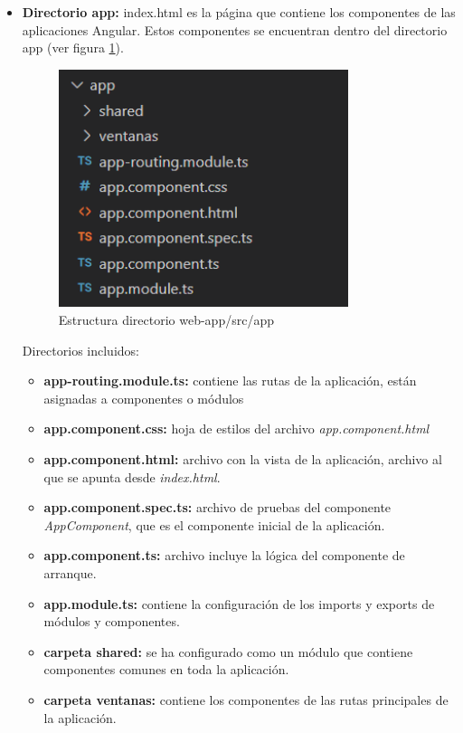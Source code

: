 \begin{itemize}
    \item \textbf{Directorio app:} index.html es la página que contiene los componentes de las aplicaciones Angular. Estos componentes se encuentran dentro del directorio app (ver figura \ref{fig:app_angular}).
    
    \begin{figure}[h!] 
    \centering
        \includegraphics[width=0.8\textwidth]{img/app_angular.PNG}
    \caption{Estructura directorio web-app/src/app}
    \label{fig:app_angular}
    \end{figure}
    
    \newpage
    Directorios incluidos:
    
        \begin{itemize}
            \item \textbf{app-routing.module.ts:} contiene las rutas de la aplicación, están asignadas a componentes o módulos
            \item \textbf{app.component.css:} hoja de estilos del archivo \textit{app.component.html}
            \item \textbf{app.component.html:} archivo con la vista de la aplicación, archivo al que se apunta desde \textit{index.html}.
            \item \textbf{app.component.spec.ts:} archivo de pruebas del componente \textit{AppComponent}, que es el componente inicial de la aplicación.
            \item \textbf{app.component.ts:} archivo incluye la lógica del componente de arranque.
            \item \textbf{app.module.ts: }contiene la configuración de los imports y exports de módulos y componentes.
            \item \textbf{carpeta shared: } se ha configurado como un módulo que contiene componentes comunes en toda la aplicación.
            \item \textbf{carpeta ventanas:} contiene los componentes de las rutas principales de la aplicación.
        \end{itemize}
    

\end{itemize}
